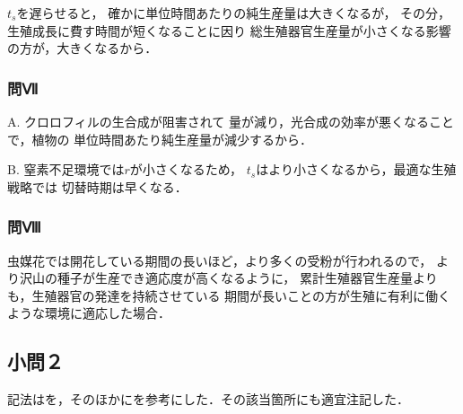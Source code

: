 \documentclass[uplatex, dvipdfmx]{jsarticle}
\begin{document}
$t_s$を遅らせると，
確かに単位時間あたりの純生産量は大きくなるが，
その分，生殖成長に費す時間が短くなることに因り
総生殖器官生産量が小さくなる影響の方が，大きくなるから．

\subsubsection{問Ⅶ}

A. クロロフィルの生合成が阻害されて
量が減り，光合成の効率が悪くなることで，植物の
単位時間あたり純生産量が減少するから．

B. 窒素不足環境では$r$が小さくなるため，
$t_s$はより小さくなるから，最適な生殖戦略では
切替時期は早くなる．

\subsubsection{問Ⅷ}

虫媒花では開花している期間の長いほど，より多くの受粉が行われるので，
より沢山の種子が生産でき適応度が高くなるように，
累計生殖器官生産量よりも，生殖器官の発達を持続させている
期間が長いことの方が生殖に有利に働くような環境に適応した場合．

\subsection{小問２}

記法は\cite{坂和愛幸}を，そのほかに\cite{Optimal growth schedule of deciduoustree seedlings}\cite{Shoot/root balance of plants: Optimal growth of a system with many vegetative organs}を参考にした．その該当箇所にも適宜注記した．
\end{document}
